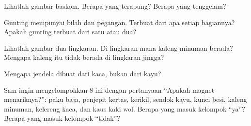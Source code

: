 \begin{exercise}[$\star$]\label{exo:g1:materials-around-us:7}
Lihatlah gambar baskom. Berapa  yang terapung? Berapa yang
tenggelam?
\end{exercise}

\begin{exercise}[$\star$]\label{exo:g1:materials-around-us:8}
Gunting mempunyai bilah dan pegangan. Terbuat dari  apa setiap
bagiannya? Apakah gunting terbuat dari satu  atau dua?
\end{exercise}

\begin{exercise}[$\star$]\label{exo:g1:materials-around-us:9}
Lihatlah gambar dua lingkaran. Di lingkaran mana kaleng minuman berada?
Mengapa kaleng itu tidak berada di lingkaran jingga?
\end{exercise}

\begin{exercise}[$\star\star$]\label{exo:g1:materials-around-us:10}
Mengapa jendela dibuat dari kaca, bukan dari kayu?
\end{exercise}

\begin{exercise}[$\star\star$]\label{exo:g1:materials-around-us:11}
Sam ingin mengelompokkan 8  ini dengan pertanyaan ``Apakah
magnet menariknya?'': paku baja, penjepit kertas, kerikil, sendok
kayu, kunci besi, kaleng minuman, kelereng kaca, dan kaus kaki wol.
Berapa  yang
masuk kelompok ``ya''? Berapa yang masuk kelompok ``tidak''?
\end{exercise}
